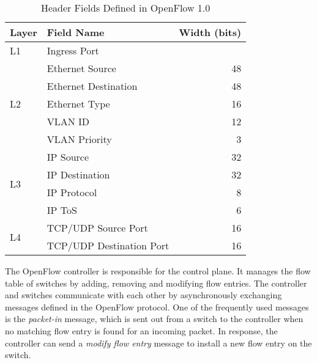 \begin{table}
\centering
\caption{Header Fields Defined in OpenFlow 1.0}%
\label{tbl:flow-fields}
\begin{tabular}{@{}llr@{}}
\toprule
Layer               & Field Name               & Width (bits) \\ \midrule
L1                  & Ingress Port             &              \\ \cmidrule(l){2-3}
\multirow{5}{*}{L2} & Ethernet Source          & 48           \\
                    & Ethernet Destination     & 48           \\
                    & Ethernet Type            & 16           \\
                    & VLAN ID                  & 12           \\
                    & VLAN Priority            & 3            \\ \cmidrule(l){2-3}
\multirow{4}{*}{L3} & IP Source                & 32           \\
                    & IP Destination           & 32           \\
                    & IP Protocol              & 8            \\
                    & IP ToS                   & 6            \\ \cmidrule(l){2-3}
\multirow{2}{*}{L4} & TCP/UDP Source Port      & 16           \\
                    & TCP/UDP Destination Port & 16           \\ \bottomrule
\end{tabular}
\end{table}

The OpenFlow controller is responsible for the control plane. It manages
the flow table of switches by adding, removing and modifying flow
entries. The controller and switches communicate with each other by
asynchronously exchanging messages defined in the OpenFlow protocol. One
of the frequently used messages is the \emph{packet-in} message, which
is sent out from a switch to the controller when no matching flow entry
is found for an incoming packet. In response, the controller can send a
\emph{modify flow entry} message to install a new flow entry on the
switch.

